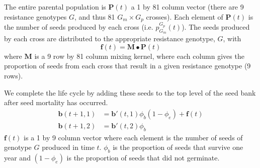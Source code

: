 \documentclass[12pt, a4paper]{article}
\begin{document}
The entire parental population is $\mathbf{P}(t)$ a 1 by 81 column vector (there are 9 resistance genotypes $G$, and thus 81 $G_m \times G_p$ crosses). Each element of $\mathbf{P}(t)$ is the number of seeds produced by each cross (i.e. $p_{G_m}^{G_p}(t)$). The seeds produced by each cross are distributed to the appropriate resistance genotype, $G$, with
\begin{equation}
	\mathbf{f}(t) = \mathbf{M} \bullet \mathbf{P}(t)
\end{equation}  
where $\mathbf{M}$ is a 9 row by 81 column mixing kernel, where each column gives the proportion of seeds from each cross that result in a given resistance genotype (9 rows). 

We complete the life cycle by adding these seeds to the top level of the seed bank after seed mortality has occurred. 
\begin{subequations}
\label{eq:seedbank_update}
\begin{align}
	\mathbf{b}(t + 1, 1) &= \mathbf{b}'(t, 1)\phi_b(1 - \phi_e) + \mathbf{f}(t)\\
	\mathbf{b}(t + 1, 2) &= \mathbf{b}'(t, 2)\phi_b   
\end{align}
\end{subequations}
$\mathbf{f}(t)$ is a 1 by 9 column vector where each element is the number of seeds of genotype $G$ produced in time $t$. $\phi_b$ is the proportion of seeds that survive one year and $(1 - \phi_e)$ is the proportion of seeds that did not germinate.


 
\end{document}
